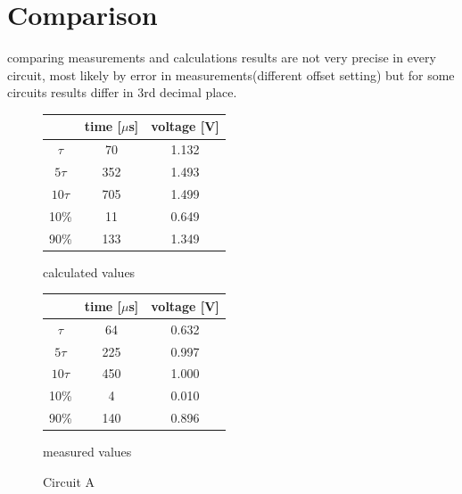 \documentclass[notitlepage, a4paper, 11pt]{article}
\begin{document}
	\newpage
	\section{Comparison}
	
	comparing measurements and calculations results are not very precise in every circuit, most likely by error in measurements(different offset setting) but for some circuits results differ in 3rd decimal place.
	
	\begin{figure}[H]
		\centering
		\begin{subtable}{0.45\textwidth}
			\centering
			\begin{tabular}{|c|c|c|}
			\hline
			& time [$\mu$s] & voltage [V] \\
			\hline
			$\tau$ & 70 & 1.132 \\
			\hline		
			$5\tau$ & 352 & 1.493 \\
			\hline
			$10\tau$ & 705 & 1.499 \\
			\hline
			10\% & 11 & 0.649 \\
			\hline
			90\% & 133 & 1.349 \\
			\hline
			\end{tabular}
			\caption{calculated values}
		\end{subtable}
		\hfill
		\begin{subtable}{0.45\textwidth}
			\centering
			\begin{tabular}{|c|c|c|}
				\hline
				& time [$\mu$s] & voltage [V] \\
				\hline
				$\tau$ & 64 & 0.632 \\
				\hline		
				$5\tau$ & 225 & 0.997 \\
				\hline
				$10\tau$ & 450 & 1.000 \\
				\hline
				10\% & 4 & 0.010 \\
				\hline
				90\% & 140 & 0.896 \\
				\hline
			\end{tabular}
			\caption{measured values}
		\end{subtable}
		\caption{Circuit A}
	\end{figure}	
	
\end{document}
